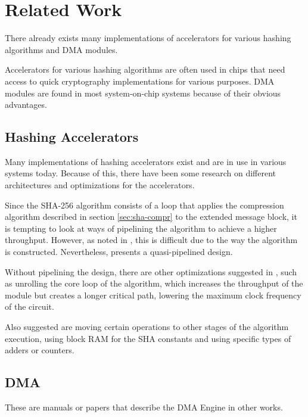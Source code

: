 \chapter{Related Work}

There already exists many implementations of accelerators for various hashing
algorithms and DMA modules.

Accelerators for various hashing algorithms are often used in chips that need
access to quick cryptography implementations for various purposes. DMA modules are
found in most system-on-chip systems because of their obvious advantages.

\section{Hashing Accelerators}
\label{sec:previous-hash}
Many implementations of hashing accelerators exist and are in use in various
systems today. Because of this, there have been some research on different
architectures and optimizations for the accelerators.

Since the SHA-256 algorithm consists of a loop that applies the compression
algorithm described in section \ref{sec:sha-compr} to the extended message
block, it is tempting to look at ways of pipelining the algorithm to achieve
a higher throughput. However, as noted in \cite{sha-opt}, this is difficult
due to the way the algorithm is constructed. Nevertheless, \cite{dadda-sha}
presents a quasi-pipelined design.

Without pipelining the design, there are other optimizations suggested in
\cite{sha-opt}, such as unrolling the core loop of the algorithm, which
increases the throughput of the module but creates a longer critical path,
lowering the maximum clock frequency of the circuit.

Also suggested are moving certain operations to other stages of the algorithm
execution, using block RAM for the SHA constants and using specific types of
adders or counters.

\section{DMA}
These are manuals or papers that describe the DMA Engine in other works.
